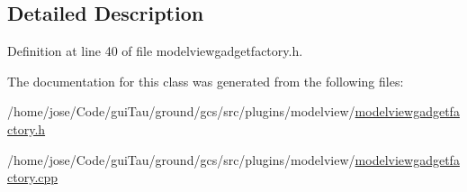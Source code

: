 \subsection{Detailed Description}


Definition at line 40 of file modelviewgadgetfactory.\-h.



The documentation for this class was generated from the following files\-:\begin{DoxyCompactItemize}
\item 
/home/jose/\-Code/gui\-Tau/ground/gcs/src/plugins/modelview/\hyperlink{modelviewgadgetfactory_8h}{modelviewgadgetfactory.\-h}\item 
/home/jose/\-Code/gui\-Tau/ground/gcs/src/plugins/modelview/\hyperlink{modelviewgadgetfactory_8cpp}{modelviewgadgetfactory.\-cpp}\end{DoxyCompactItemize}
